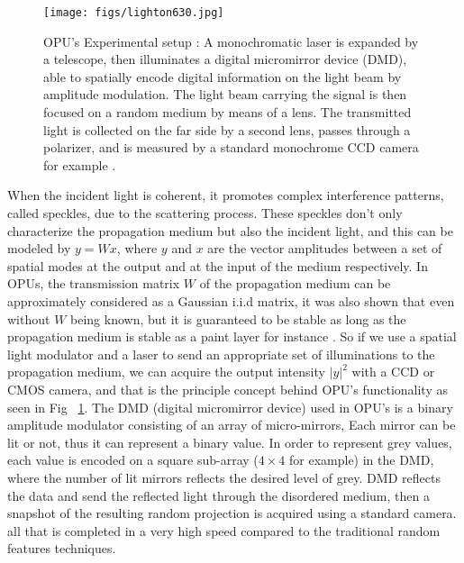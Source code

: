 \begin{figure}[ht!]
\begin{center}
\texttt{[image: figs/lighton630.jpg]}
\end{center}
\caption[OPU's Experimental setup]{OPU's Experimental setup \citep{saade_opu}: A monochromatic laser is expanded by a telescope, then
illuminates a digital micromirror device (DMD), able to spatially encode digital information on the light beam by
amplitude modulation. The light beam carrying the signal is then focused on a random
medium by means of a lens. The transmitted light is collected on the
far side by a second lens, passes through a polarizer, and is measured by a standard monochrome CCD camera for example .}
\label{fig_opu}
\end{figure}
When the incident light is coherent, it promotes complex interference patterns, called speckles, due to the scattering process.
These speckles don't only characterize the propagation medium but also the incident light, and this can be modeled by $y=Wx$, 
where $y$ and $x$ are the vector amplitudes between a set of spatial modes at the output and at the input of the medium respectively. In OPUs, the transmission matrix $W$ of the propagation medium can be approximately considered as a Gaussian i.i.d matrix, it was also shown that even without $W$ being known, but it is guaranteed to be stable as long as the propagation medium is stable as a paint layer for instance \citep{saade_opu}.  So if we use a spatial light modulator and a laser to send an appropriate set of illuminations to the propagation medium, we can acquire the output intensity $|y|^2$ with a CCD or CMOS camera, and that is the principle concept behind OPU's functionality as seen in Fig~ \ref{fig_opu}.\newline 
The DMD (digital micromirror device) used in OPU's is a binary amplitude modulator consisting of an array of micro-mirrors, Each mirror can be lit or not, thus it can represent  a binary value. In order to represent grey values, each value is encoded on a square sub-array ($4\times 4$ for example) in the DMD, where the number of lit mirrors reflects the desired level of grey. DMD reflects the data and send the reflected light through the disordered medium, then a snapshot of the resulting random projection is acquired using a standard camera. all that is completed in a very high speed compared to the traditional random features techniques. 
